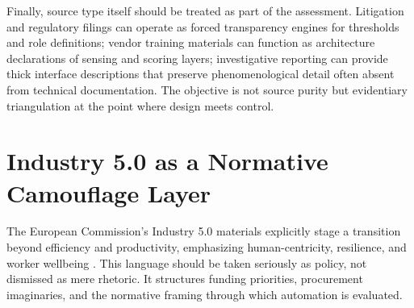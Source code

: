 \documentclass[runningheads]{llncs}
\begin{document}
Finally, source type itself should be treated as part of the assessment. Litigation and regulatory filings can operate as forced transparency engines for thresholds and role definitions; vendor training materials can function as architecture declarations of sensing and scoring layers; investigative reporting can provide thick interface descriptions that preserve phenomenological detail often absent from technical documentation. The objective is not source purity but evidentiary triangulation at the point where design meets control.

\section{Industry 5.0 as a Normative Camouflage Layer}

The European Commission's Industry 5.0 materials explicitly stage a transition beyond efficiency and productivity, emphasizing human-centricity, resilience, and worker wellbeing \cite{breque2021industry}. This language should be taken seriously as policy, not dismissed as mere rhetoric. It structures funding priorities, procurement imaginaries, and the normative framing through which automation is evaluated.

\begin{table}
\caption{Comparative ORCON architectures across military, platform, and workplace settings}\label{tab:orcon-compare}
\centering
\small
{}
\end{table}
\end{document}
